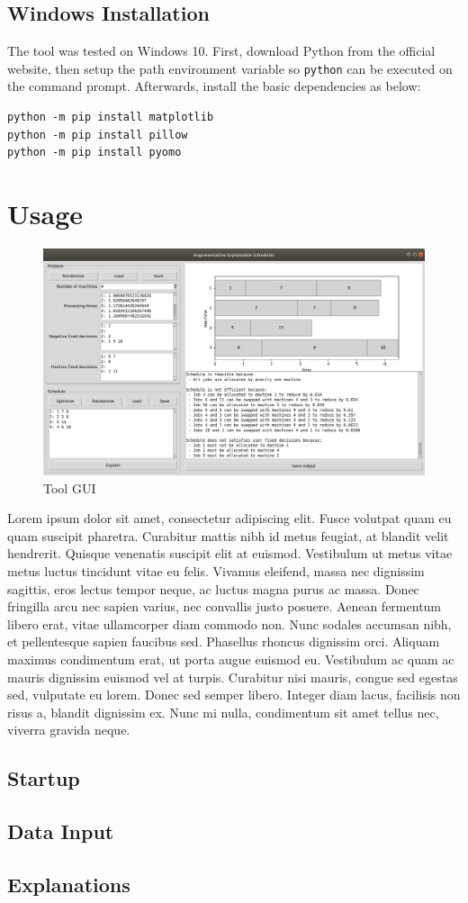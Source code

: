 \subsection{Windows Installation}

The tool was tested on Windows 10. First, download Python from the official website, then setup the path environment variable so \texttt{python} can be executed on the command prompt. Afterwards, install the basic dependencies as below: 

\begin{verbatim}
python -m pip install matplotlib
python -m pip install pillow
python -m pip install pyomo
\end{verbatim}

\section{Usage}

\begin{figure}[H]
	\centering
	\includegraphics[width=\linewidth]{figures/tool_gui.png}
	\caption{Tool GUI}
\end{figure}

Lorem ipsum dolor sit amet, consectetur adipiscing elit. Fusce volutpat quam eu quam suscipit pharetra. Curabitur mattis nibh id metus feugiat, at blandit velit hendrerit. Quisque venenatis suscipit elit at euismod. Vestibulum ut metus vitae metus luctus tincidunt vitae eu felis. Vivamus eleifend, massa nec dignissim sagittis, eros lectus tempor neque, ac luctus magna purus ac massa. Donec fringilla arcu nec sapien varius, nec convallis justo posuere. Aenean fermentum libero erat, vitae ullamcorper diam commodo non. Nunc sodales accumsan nibh, et pellentesque sapien faucibus sed. Phasellus rhoncus dignissim orci. Aliquam maximus condimentum erat, ut porta augue euismod eu. Vestibulum ac quam ac mauris dignissim euismod vel at turpis. Curabitur nisi mauris, congue sed egestas sed, vulputate eu lorem. Donec sed semper libero. Integer diam lacus, facilisis non risus a, blandit dignissim ex. Nunc mi nulla, condimentum sit amet tellus nec, viverra gravida neque.

\subsection{Startup}

\subsection{Data Input}

\subsection{Explanations}